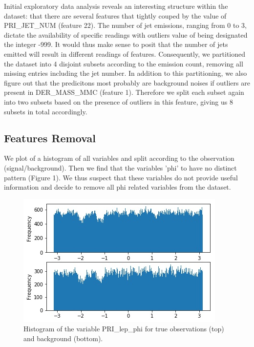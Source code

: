 \documentclass[10pt,conference,compsocconf]{IEEEtran}
\begin{document}
Initial exploratory data analysis reveals an interesting structure within the dataset: that there are several features that tightly couped by the value of PRI\_JET\_NUM (feature 22). The number of jet emissions, ranging from 0 to 3, dictate the availability of specific readings with outliers value of being designated the integer -999. It would thus make sense to posit that the number of jets emitted will result in different readings of features. Consequently, we partitioned the dataset into 4 disjoint subsets according to the emission count, removing all missing entries including the jet number. In addition to this partitioning, we also figure out that the predicitons most probably are background noises if outliers are present in DER\_MASS\_MMC (feature 1). Therefore we split each subset again into two subsets based on the presence of outliers in this feature, giving us 8 subsets in total accordingly.

\subsection{Features Removal}
We plot of a histogram of all variables and split according to the observation (signal/background). Then we find that the variables 'phi' to have no distinct pattern (Figure 1). We thus suspect that these variables do not provide useful information and decide to remove all phi related variables from the dataset.

\begin{figure}[t]
\begin{center}
  \includegraphics[width=\columnwidth]{feature.jpg}
  \caption{Histogram of the variable PRI\_lep\_phi for true observations (top) and background (bottom).}
\end{center}
   \label{fig:phi}
\end{figure}
\end{document}
